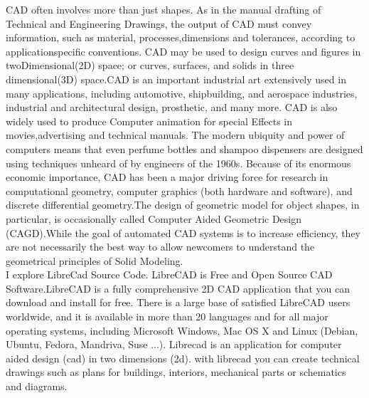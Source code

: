 CAD  often  involves  more  than  just  shapes.  As  in  the  manual  drafting  of  Technical  and  Engineering
Drawings,  the  output  of  CAD  must  convey  information,  such  as  material,  processes,dimensions  and
tolerances,  according  to  application­specific  conventions.  CAD  may  be  used  to  design  curves  and
figures  in  two­Dimensional(2D)  space;  or  curves,  surfaces,  and  solids  in  three  dimensional(3D)
space.CAD  is  an  important  industrial  art  extensively  used  in  many  applications,  including  automotive,
shipbuilding,  and  aerospace  industries,  industrial  and  architectural  design, prosthetic,  and  many  more.
CAD  is  also  widely  used  to  produce  Computer  animation  for  special  Effects  in  movies,advertising  and
technical  manuals.  The  modern  ubiquity  and  power  of  computers  means  that  even  perfume  bottles  and
shampoo  dispensers  are  designed  using   techniques unheard of by engineers of the 1960s. Because  of its
enormous  economic  importance,  CAD  has  been  a  major  driving  force  for  research  in  computational
geometry,  computer  graphics  (both  hardware  and  software),  and  discrete  differential  geometry.The
design  of  geometric  model  for  object  shapes,  in  particular,  is  occasionally  called  Computer ­Aided
Geometric  Design  (CAGD).While  the  goal  of  automated  CAD  systems  is to increase efficiency, they are
not  necessarily  the  best  way   to  allow  newcomers  to  understand  the  geometrical  principles  of  Solid
Modeling.\\


I  explore  LibreCad  Source  Code.  LibreCAD is Free and Open Source CAD Software.LibreCAD is
a  fully  comprehensive  2D  CAD   application  that  you  can  download  and  install  for  free.  There  is  a  large
base  of  satisfied  LibreCAD   users  worldwide,  and  it  is  available  in  more  than  20  languages  and  for  all
major  operating  systems,  including  Microsoft  Windows,  Mac  OS  X  and  Linux  (Debian,  Ubuntu,
Fedora,  Mandriva,  Suse  ...).  Librecad  is  an  application  for  computer  aided  design  (cad)  in  two
dimensions  (2d).  with  librecad   you   can  create  technical  drawings  such  as  plans  for  buildings,  interiors,
mechanical parts or schematics and diagrams.\\


